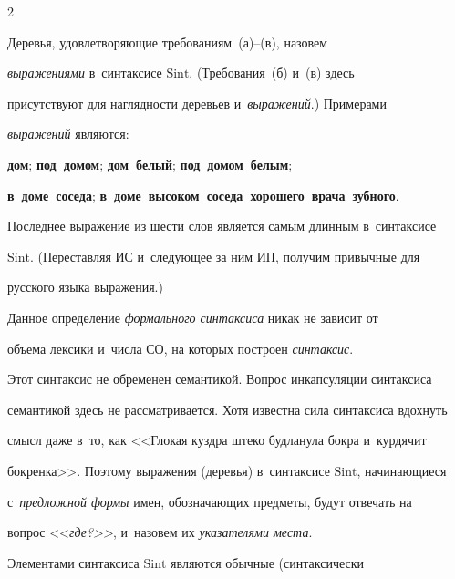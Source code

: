 \begin{multicols}{2}
\begin{itemize}
\end{itemize}





     Деревья, удовлетворяющие требованиям~(а)--(в), назовем 


\textit{выражениями} в~синтаксисе $\mathrm{Sint}$. (Требова\-ния~(б) и~(в) здесь 


присутствуют для на\-гляд\-ности деревьев и~\textit{выражений}.) Примерами 


\textit{выражений} являются:


\textbf{дом}; \textbf{под\ домом}; \textbf{дом\ белый}; \textbf{под\ домом\ белым};


\textbf{в\ доме\ соседа}; \textbf{в\ доме\ высоком\ соседа\ хорошего\ врача\ зубного}.


        


              


     Последнее выражение из шести слов является самым длинным в~синтаксисе 


$\mathrm{Sint}$. (Переставляя ИС и~следующее за ним ИП, получим привычные для 


русского языка выражения.)


     


     Данное определение \textit{формального синтаксиса} никак не зависит от 


объема лексики и~числа СО, на которых построен \textit{синтаксис}. 


     


     Этот синтаксис не обременен семантикой. Вопрос инкапсуляции синтаксиса 


семантикой здесь не рассматривается. Хотя известна сила синтаксиса вдохнуть 


смысл даже в~то, как <<Глокая куздра штеко будланула бокра и~курдячит 


бокренка>>. Поэтому выражения (деревья) в~синтаксисе $\mathrm{Sint}$, начинающиеся 


с~\textit{предложной формы} имен, обозначающих предметы, будут отвечать на 


вопрос <<\textit{где?>>}, и~назовем их \textit{указателями места}. 


     


      Элементами синтаксиса $\mathrm{Sint}$ являются обычные (синтаксически 



\end{multicols}
